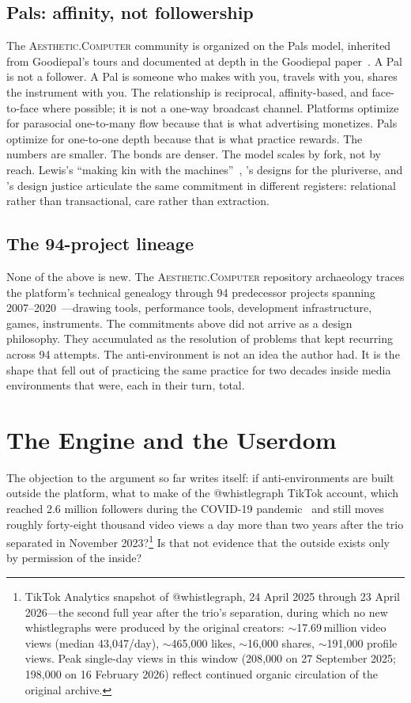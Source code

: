 \documentclass[10pt,letterpaper,twocolumn]{article}
\newcommand{\ac}{\textsc{Aesthetic.Computer}}
\begin{document}
\subsection{Pals: affinity, not followership}

The \ac{} community is organized on the Pals model, inherited from Goodiepal's tours and documented at depth in the Goodiepal paper~\citep{scudder2026goodiepal}. A Pal is not a follower. A Pal is someone who makes with you, travels with you, shares the instrument with you. The relationship is reciprocal, affinity-based, and face-to-face where possible; it is not a one-way broadcast channel. Platforms optimize for parasocial one-to-many flow because that is what advertising monetizes. Pals optimize for one-to-one depth because that is what practice rewards. The numbers are smaller. The bonds are denser. The model scales by fork, not by reach. Lewis's ``making kin with the machines''~\citep{lewis2018making}, \citet{escobar2018designs}'s designs for the pluriverse, and \citet{costanzachock2020design}'s design justice articulate the same commitment in different registers: relational rather than transactional, care rather than extraction.

\subsection{The 94-project lineage}

None of the above is new. The \ac{} repository archaeology traces the platform's technical genealogy through 94 predecessor projects spanning 2007--2020~\citep{scudder2026archaeology}---drawing tools, performance tools, development infrastructure, games, instruments. The commitments above did not arrive as a design philosophy. They accumulated as the resolution of problems that kept recurring across 94 attempts. The anti-environment is not an idea the author had. It is the shape that fell out of practicing the same practice for two decades inside media environments that were, each in their turn, total.

\section{The Engine and the Userdom}

The objection to the argument so far writes itself: if anti-environments are built outside the platform, what to make of the @whistlegraph TikTok account, which reached 2.6 million followers during the COVID-19 pandemic~\citep{scudder2026whistlegraph} and still moves roughly forty-eight thousand video views a day more than two years after the trio separated in November 2023?\footnote{TikTok Analytics snapshot of @whistlegraph, 24 April 2025 through 23 April 2026---the second full year after the trio's separation, during which no new whistlegraphs were produced by the original creators: $\sim$17.69\,million video views (median 43{,}047/day), $\sim$465{,}000 likes, $\sim$16{,}000 shares, $\sim$191{,}000 profile views. Peak single-day views in this window (208{,}000 on 27 September 2025; 198{,}000 on 16 February 2026) reflect continued organic circulation of the original archive.} Is that not evidence that the outside exists only by permission of the inside?
\end{document}
